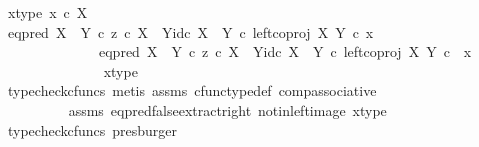 \begin{isabellebody}
\ x{\isacharunderscore}{\kern0pt}type{\isacharcolon}{\kern0pt}\ {\isachardoublequoteopen}x\ {\isasymin}\isactrlsub c\ X{\isachardoublequoteclose}\isanewline
\ \ \ \ \ \ \isamarkupfalse%
\ {\isachardoublequoteopen}{\isacharparenleft}{\kern0pt}{\isacharparenleft}{\kern0pt}eq{\isacharunderscore}{\kern0pt}pred\ {\isacharparenleft}{\kern0pt}X\ {\isasymCoprod}\ Y{\isacharparenright}{\kern0pt}\ {\isasymcirc}\isactrlsub c\ {\isasymlangle}z\ {\isasymcirc}\isactrlsub c\ {\isasymbeta}\isactrlbsub X\ {\isasymCoprod}\ Y\isactrlesub {\isacharcomma}{\kern0pt}id\isactrlsub c\ {\isacharparenleft}{\kern0pt}X\ {\isasymCoprod}\ Y{\isacharparenright}{\kern0pt}{\isasymrangle}{\isacharparenright}{\kern0pt}\ {\isasymcirc}\isactrlsub c\ left{\isacharunderscore}{\kern0pt}coproj\ X\ Y{\isacharparenright}{\kern0pt}\ {\isasymcirc}\isactrlsub c\ x\ {\isacharequal}{\kern0pt}\ \isanewline
\ \ \ \ \ \ \ \ \ \ \ \ \ \ eq{\isacharunderscore}{\kern0pt}pred\ {\isacharparenleft}{\kern0pt}X\ {\isasymCoprod}\ Y{\isacharparenright}{\kern0pt}\ {\isasymcirc}\isactrlsub c\ {\isasymlangle}z\ {\isasymcirc}\isactrlsub c\ {\isasymbeta}\isactrlbsub X\ {\isasymCoprod}\ Y\isactrlesub {\isacharcomma}{\kern0pt}id\isactrlsub c\ {\isacharparenleft}{\kern0pt}X\ {\isasymCoprod}\ Y{\isacharparenright}{\kern0pt}{\isasymrangle}\ {\isasymcirc}\isactrlsub c\ {\isacharparenleft}{\kern0pt}left{\isacharunderscore}{\kern0pt}coproj\ X\ Y\ {\isasymcirc}\isactrlsub c\ \ x{\isacharparenright}{\kern0pt}{\isachardoublequoteclose}\isanewline
\ \ \ \ \ \ \ \ \ \ \ \ \ \isamarkupfalse%
\ x{\isacharunderscore}{\kern0pt}type\ \isamarkupfalse%
\ {\isacharparenleft}{\kern0pt}typecheck{\isacharunderscore}{\kern0pt}cfuncs{\isacharcomma}{\kern0pt}\ metis\ assms\ cfunc{\isacharunderscore}{\kern0pt}type{\isacharunderscore}{\kern0pt}def\ comp{\isacharunderscore}{\kern0pt}associative{\isacharparenright}{\kern0pt}\isanewline
\ \ \ \ \ \ \isamarkupfalse%
\ \isamarkupfalse%
\ {\isachardoublequoteopen}{\isachardot}{\kern0pt}{\isachardot}{\kern0pt}{\isachardot}{\kern0pt}\ {\isacharequal}{\kern0pt}\ {\isasymf}{\isachardoublequoteclose}\isanewline
\ \ \ \ \ \ \ \ \isamarkupfalse%
\ assms\ eq{\isacharunderscore}{\kern0pt}pred{\isacharunderscore}{\kern0pt}false{\isacharunderscore}{\kern0pt}extract{\isacharunderscore}{\kern0pt}right\ not{\isacharunderscore}{\kern0pt}in{\isacharunderscore}{\kern0pt}left{\isacharunderscore}{\kern0pt}image\ x{\isacharunderscore}{\kern0pt}type\ \isamarkupfalse%
\ {\isacharparenleft}{\kern0pt}typecheck{\isacharunderscore}{\kern0pt}cfuncs{\isacharcomma}{\kern0pt}\ presburger{\isacharparenright}{\kern0pt}\isanewline

\end{isabellebody}
